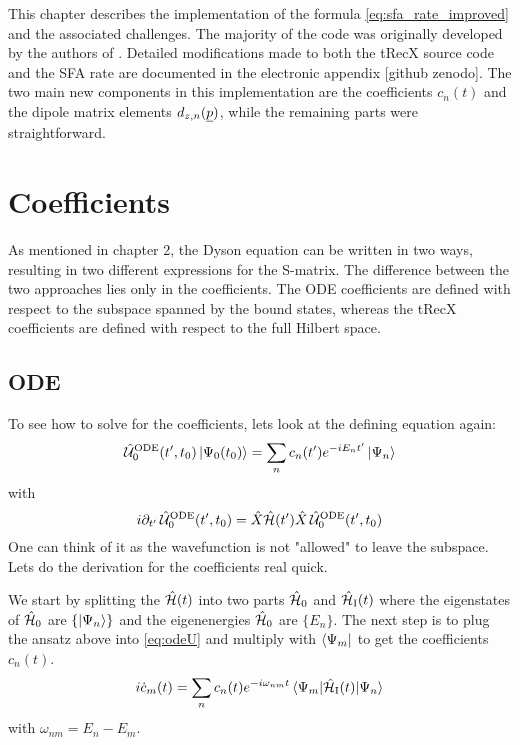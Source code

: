 This chapter describes the implementation of the formula \eqref{eq:sfa_rate_improved} and the associated challenges.
The majority of the code was originally developed by the authors of \cite{Theory_NPS}.
Detailed modifications made to both the tRecX source code and the SFA rate are documented in the electronic appendix [github zenodo].
The two main new components in this implementation are the coefficients $c_n(t)$ and the dipole matrix elements $d_{z,n}(\underline{p})$, while the remaining parts were straightforward.




\section{Coefficients}
As mentioned in chapter 2, the Dyson equation can be written in two ways, resulting in two different expressions for the S-matrix.
The difference between the two approaches lies only in the coefficients.
The ODE coefficients are defined with respect to the subspace spanned by the bound states, whereas the tRecX coefficients are defined with respect to the full Hilbert space.



\subsection{ODE}
To see how to solve for the coefficients, lets look at the defining equation again:
\begin{equation*}
    \hat{\mathcal{U}}^{\mathrm{ODE}}_0(t',t_0)\ket{\Psi_0(t_0)} = \sum_{n}c_n(t')e^{-iE_nt'}\ket{\Psi_n}
\end{equation*}
with
\begin{equation}
    i\partial_{t'} \, \hat{\mathcal{U}}^{\mathrm{ODE}}_0(t',t_0) = \hat{X}\hat{\mathcal{H}}(t')\hat{X}\,\hat{\mathcal{U}}^{\mathrm{ODE}}_0(t',t_0)    \label{eq:odeU}
\end{equation}
One can think of it as the wavefunction is not "allowed" to leave the subspace. 
Lets do the derivation for the coefficients real quick.

We start by splitting the $\hat{\mathcal{H}}(t)$ into two parts $\hat{\mathcal{H}}_0$ and $\hat{\mathcal{H}}_{\mathrm{I}}(t)$ where the eigenstates of $\hat{\mathcal{H}}_0$ are $\{\ket{\Psi_n}\}$ and the eigenenergies $\hat{\mathcal{H}}_0$ are $\{E_n\}$. 
The next step is to plug the ansatz above into \eqref{eq:odeU} and multiply with $\bra{\Psi_m}$ to get the coefficients $c_n(t)$.
\begin{equation*}
    i  \dot{c}_m(t) = \sum_n c_n(t) e^{-i \omega_{nm} t} \braket{\Psi_m|\hat{\mathcal{H}}_{\mathrm{I}}(t)|\Psi_n}  \label{eq:ode}
\end{equation*}
with $\omega_{nm} = E_n - E_m$.

